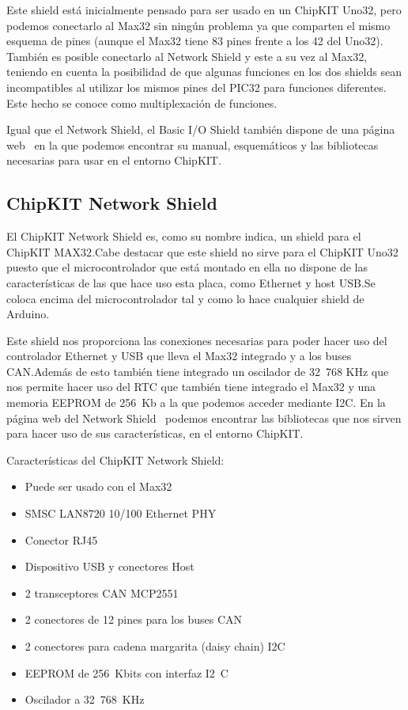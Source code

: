 Este shield está inicialmente pensado para ser usado en un ChipKIT Uno32, pero podemos conectarlo al Max32 sin ningún problema ya que comparten el mismo esquema de pines (aunque el Max32 tiene 83 pines frente a los 42 del Uno32). También es posible conectarlo al Network Shield y este a su vez al Max32, teniendo en cuenta la posibilidad de que algunas funciones en los dos shields sean incompatibles al utilizar los mismos pines del PIC32 para funciones diferentes. Este hecho se conoce como multiplexación de funciones.

Igual que el Network Shield, el Basic I/O Shield también dispone de una página web~\cite{website:io_shield} en la que podemos encontrar su manual, esquemáticos y las bibliotecas necesarias para usar en el entorno ChipKIT.\@
\subsection{ChipKIT Network Shield}

El ChipKIT Network Shield es, como su nombre indica, un shield para el ChipKIT MAX32.\@ Cabe destacar que este shield no sirve para el ChipKIT Uno32 puesto que el microcontrolador que está montado en ella no dispone de las características de las que hace uso esta placa, como Ethernet y host USB.\@ Se coloca encima del microcontrolador tal y como lo hace cualquier shield de Arduino.


Este shield nos proporciona las conexiones necesarias para poder hacer uso del controlador Ethernet y USB que lleva el Max32 integrado y a los buses CAN.\@ Además de esto también tiene integrado un oscilador de 32~768 KHz que nos permite hacer uso del RTC que también tiene integrado el Max32 y una memoria EEPROM de 256~Kb a la que podemos acceder mediante I2C. En la página web del Network Shield~\cite{website:network_shield} podemos encontrar las bibliotecas que nos sirven para hacer uso de sus características, en el entorno ChipKIT.\@

Características del ChipKIT Network Shield:
\begin{itemize}
	\item Puede ser usado con el Max32
	\item SMSC LAN8720 10/100 Ethernet PHY
	\item Conector RJ45
	\item Dispositivo USB y conectores Host
	\item 2 transceptores CAN MCP2551
	\item 2 conectores de 12 pines para los buses CAN
	\item 2 conectores para cadena margarita (daisy chain) I2C
	\item EEPROM de 256~Kbits con interfaz I2~C
	\item Oscilador a 32~768~KHz
\end{itemize}


